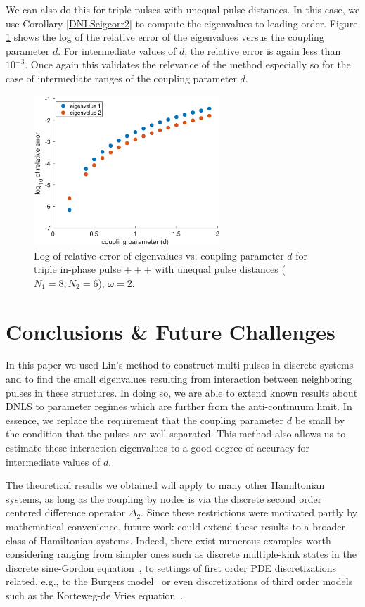 \documentclass[12pt]{elsarticle}
\begin{document}
We can also do this for triple pulses with unequal pulse distances. In this case, we use Corollary \ref{DNLSeigcorr2} to compute the eigenvalues to leading order. Figure \ref{fig:error2} shows the log of the relative error of the eigenvalues versus the coupling parameter $d$.
For intermediate values of $d$, the relative error is again less than $10^{-3}$. Once again this validates the relevance
of the method especially so for the case of 
intermediate ranges of the coupling parameter $d$.

\begin{figure}[H]
\centering
\includegraphics[width=7cm]{errors3.eps}
\caption{Log of relative error of eigenvalues vs. coupling parameter $d$ for triple in-phase pulse $+++$ with unequal pulse distances ($N_1 = 8, N_2 = 6$), $\omega = 2$.}
\label{fig:error2}
\end{figure}

\section{Conclusions \& Future Challenges}

In this paper we used Lin's method to construct multi-pulses in discrete systems and to find the small eigenvalues resulting from interaction between neighboring pulses in these structures. In doing so, we are able to extend known results about DNLS to parameter regimes which are further from the anti-continuum limit. In essence, we replace the requirement that the coupling parameter $d$ be small by the condition that the pulses are well separated. This method also allows us to estimate these interaction eigenvalues to a good degree of accuracy for intermediate values of $d$.


The theoretical results we obtained will apply to many other Hamiltonian systems, as long as the coupling by nodes is via the discrete second order centered difference operator $\Delta_2$. Since these restrictions were motivated partly by mathematical convenience, future work could extend these results to a broader class of Hamiltonian systems. Indeed, there exist numerous 
examples worth considering ranging from simpler
ones such as discrete multiple-kink states in 
the discrete sine-Gordon equation~\cite{peyrard},
to settings of first order PDE discretizations
related, e.g., to the Burgers model~\cite{turner}
or even discretizations of third order models
such as the Korteweg-de Vries equation~\cite{ohta}. 
\end{document}
